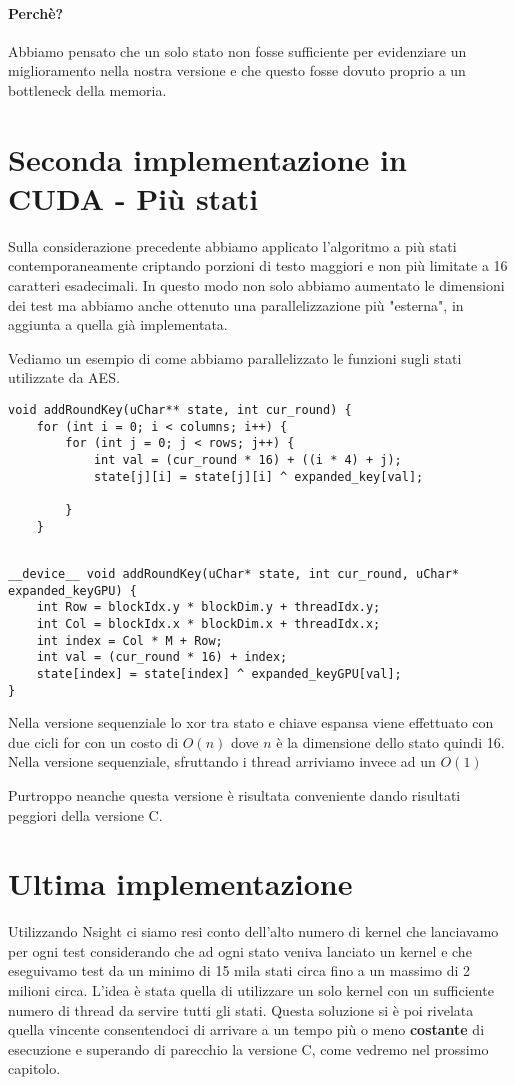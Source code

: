 \paragraph{Perchè?} Abbiamo pensato che un solo stato non fosse sufficiente per evidenziare un miglioramento nella nostra versione e che questo fosse dovuto proprio a un bottleneck della memoria.

\section{Seconda implementazione in CUDA - Più stati}
Sulla considerazione precedente abbiamo applicato l'algoritmo a più stati contemporaneamente criptando porzioni di testo maggiori e non più limitate a 16 caratteri esadecimali.
In questo modo non solo abbiamo aumentato le dimensioni dei test ma abbiamo anche ottenuto una parallelizzazione più "esterna", in aggiunta a quella già implementata.

Vediamo un esempio di come abbiamo parallelizzato le funzioni sugli stati utilizzate da AES.

\begin{lstlisting}[caption={Versione sequenziale di addRoundKey}]
void addRoundKey(uChar** state, int cur_round) {
	for (int i = 0; i < columns; i++) {
		for (int j = 0; j < rows; j++) {
			int val = (cur_round * 16) + ((i * 4) + j);
			state[j][i] = state[j][i] ^ expanded_key[val];

		}
	}
	
	\end{lstlisting}

\begin{lstlisting}[caption={Versione parallela di addRoundKey}]
__device__ void addRoundKey(uChar* state, int cur_round, uChar* expanded_keyGPU) {
	int Row = blockIdx.y * blockDim.y + threadIdx.y;
	int Col = blockIdx.x * blockDim.x + threadIdx.x;
	int index = Col * M + Row;
	int val = (cur_round * 16) + index;
	state[index] = state[index] ^ expanded_keyGPU[val];
}
\end{lstlisting}

Nella versione sequenziale lo xor tra stato e chiave espansa viene effettuato con due cicli for con un costo di \(O(n)\) dove \(n\) è la dimensione dello stato quindi 16. Nella versione sequenziale, sfruttando i thread arriviamo invece ad un \(O(1)\)

Purtroppo neanche questa versione è risultata conveniente dando risultati peggiori della versione C.

\section{Ultima implementazione}
Utilizzando Nsight ci siamo resi conto dell'alto numero di kernel che lanciavamo per ogni test considerando che ad ogni stato veniva lanciato un kernel e che eseguivamo test da un minimo di 15 mila stati circa fino a un massimo di 2 milioni circa. L'idea è stata quella di utilizzare un solo kernel con un sufficiente numero di thread da servire tutti gli stati.
Questa soluzione si è poi rivelata quella vincente consentendoci di arrivare a un tempo più o meno \textbf{costante} di esecuzione e superando di parecchio la versione C, come vedremo nel prossimo capitolo.